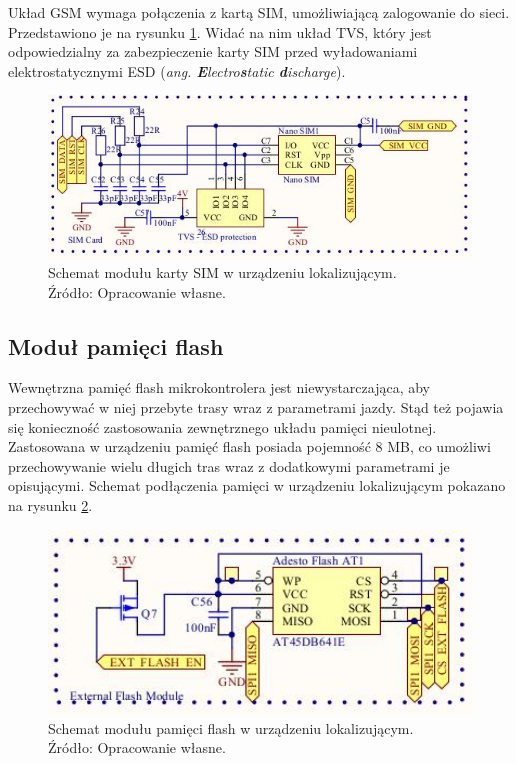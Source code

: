 Układ GSM wymaga połączenia z kartą SIM, umożliwiającą zalogowanie do sieci. Przedstawiono je na rysunku \ref{fig:image_mainboard_functional_gsm_sim_card}. Widać na nim układ TVS, który jest odpowiedzialny za zabezpieczenie karty SIM przed wyładowaniami elektrostatycznymi ESD (\textit{ang. \textbf{E}lectro\textbf{s}tatic \textbf{d}ischarge}).

\begin{figure}[H]
	\centering
	\includegraphics[width=15cm]{img/schematics/mainboard_gsm_sim_card.jpg}
	\caption{Schemat modułu karty SIM w urządzeniu lokalizującym. \\ Źródło: Opracowanie własne.}
	\label{fig:image_mainboard_functional_gsm_sim_card}
\end{figure}

\subsection{Moduł pamięci flash}

Wewnętrzna pamięć flash mikrokontrolera jest niewystarczająca, aby przechowywać w niej przebyte trasy wraz z parametrami jazdy. Stąd też pojawia się konieczność zastosowania zewnętrznego układu pamięci nieulotnej. Zastosowana w urządzeniu pamięć flash posiada pojemność 8 MB, co umożliwi przechowywanie wielu długich tras wraz z dodatkowymi parametrami je opisującymi. Schemat podłączenia pamięci w urządzeniu lokalizującym pokazano na rysunku \ref{fig:image_mainboard_functional_flash}.

\begin{figure}[H]
	\centering
	\includegraphics[width=15cm]{img/schematics/mainboard_functional_flash_memory.jpg}
	\caption{Schemat modułu pamięci flash w urządzeniu lokalizującym. \\ Źródło: Opracowanie własne.}
	\label{fig:image_mainboard_functional_flash}
\end{figure}

